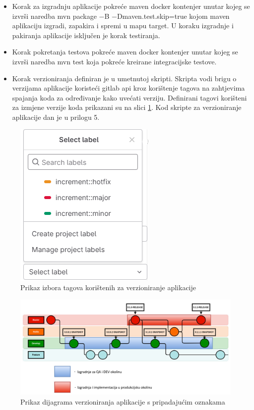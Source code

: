 \documentclass[a4paper,12pt,oneside]{article}
\begin{document}
\begin{itemize}

\item Korak za izgradnju aplikacije pokreće maven docker kontenjer unutar kojeg se izvrši naredba mvn package −B −Dmaven.test.skip=true kojom maven aplikaciju izgradi, zapakira i spremi u mapu target. U koraku izgradnje i pakiranja aplikacije isključen je korak testiranja.

\item Korak pokretanja testova pokreće maven docker kontenjer unutar kojeg se izvrši naredba mvn test koja pokreće kreirane integracijske testove.

\item Korak verzioniranja definiran je u umetnutoj skripti. Skripta vodi brigu o verzijama aplikacije koristeći gitlab api kroz korištenje tagova na zahtjevima spajanja koda za određivanje kako uvećati verziju. Definirani tagovi korišteni za izmjene verzije koda prikazani su na slici \ref{fig:label selection}. Kod skripte za verzioniranje aplikacije dan je u prilogu 5.
\end{itemize}

\begin{figure}
    \centering
    \includegraphics[width=0.4\linewidth]{Slike/label-selection.png}
    \caption{Prikaz izbora tagova korištenih za verzioniranje aplikacije}
    \label{fig:label selection}
\end{figure}

\begin{figure}
    \centering
    \includegraphics[width=1\linewidth]{Slike/versioning-tree.png}
    \caption{Prikaz dijagrama verzioniranja aplikacije s pripadajućim oznakama}
    \label{fig:versioning-tree}
\end{figure}
\end{document}
